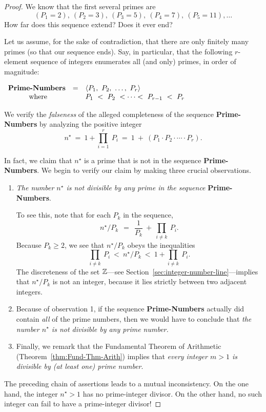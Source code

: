 \begin{proof}
We know that the first several primes are
\[ (P_1 =2), \ (P_2 = 3), \ (P_3 =5), \ (P_4 = 7), \ (P_5 =11), \ldots \] 
How far does this sequence extend?  Does it ever end?

Let us assume, for the sake of contradiction, that there are only
finitely many primes (so that our sequence ends).  Say, in particular,
that the following $r$-element sequence of integers enumerates all
(and only) primes, in order of magnitude:

$ \begin{array}{ccl}
\mbox{\bf Prime-Numbers} & = & 
\langle P_1, \ P_2, \ \ldots, \ P_r \rangle \\
\mbox{ where} &  &
P_1 \ < \ P_2 \ < \cdots < \ P_{r-1} \ < \ P_r
\end{array}
$

\medskip

We verify the {\em falseness} of the alleged completeness of the sequence
{\bf Prime-Numbers} by analyzing the positive integer
\[ n^\star \ = \ 1 + \prod_{i=1}^r \ P_i \ = \ 1 \ + \ 
\left(P_1 \cdot P_2 \cdot \cdots \cdot P_r \right).
\]

In fact, we claim that $n^\star$ is a prime that is not in the
sequence {\bf Prime-Numbers}.  We begin to verify our claim by making
three crucial observations.
\begin{enumerate}
\item
{\em The number $n^\star$ is not divisible by any prime in the sequence}
{\bf Prime-Numbers}.

To see this, note that for each $P_k$ in the sequence,
\[
n^\star / P_k \ \ = \ \ \frac{1}{P_k} \ + \ \prod_{i \neq k} \ P_i .
\]
Because $P_k \geq 2$, we see that $n^\star / P_k$ obeys the inequalities
\[
\prod_{i \neq k} \ P_i \ < \ n^\star /P_k \ < \ 1 + \prod_{i \neq k} \ P_i.
\] 
The discreteness of the set $\mathbb{Z}$---see
Section~\ref{sec:integer-number-line}---implies that $n^\star / P_k$ is not
an integer, because it lies strictly between two adjacent integers.

\item
Because of observation 1, if the sequence {\bf Prime-Numbers} actually
did contain {\em all} of the prime numbers, then we would have to
conclude that {\em the number $n^\star$ is not divisible by any prime
  number.}

\item
Finally, we remark that the Fundamental Theorem of Arithmetic
(Theorem~\ref{thm:Fund-Thm-Arith}) implies that {\em every integer $m
  >1$ is divisible by (at least one) prime number}.
\end{enumerate}
The preceding chain of assertions leads to a mutual inconsistency.  On
the one hand, the integer $n^\star >1$ has no prime-integer divisor.
On the other hand, no such integer can fail to have a prime-integer
divisor!


\end{proof}
